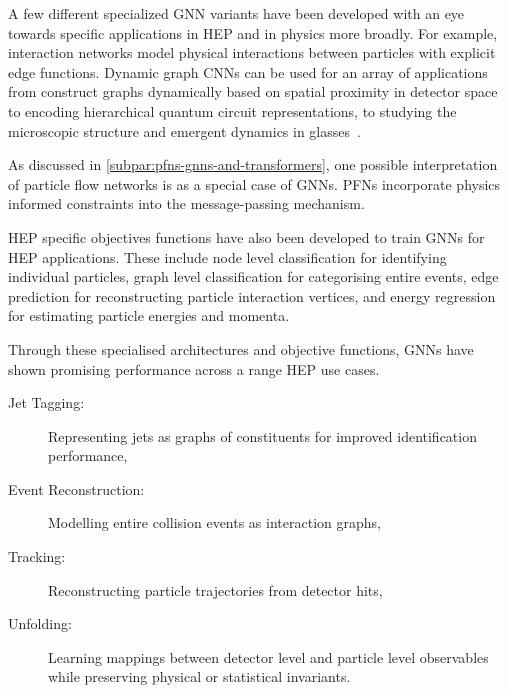                 A few different specialized GNN variants have been developed with an eye towards specific applications in HEP and in physics more broadly.
                For example,
                interaction networks model physical interactions between particles with explicit edge functions.
                Dynamic graph CNNs can be used for an array of applications from construct graphs dynamically based on spatial proximity in detector space to encoding hierarchical quantum circuit representations, to studying the microscopic structure and emergent dynamics in glasses~\cite{Wang:2018nkf, Ting:2025iom, Jung:2023wef, Lourens:2022vpu}.
                
                As discussed in \cref{subpar:pfns-gnns-and-transformers}, one possible interpretation of particle flow networks is as a special case of GNNs.
                PFNs incorporate physics informed constraints into the message-passing mechanism.
                
                HEP specific objectives functions have also been developed to train GNNs for HEP applications. 
                These include node level classification for identifying individual particles,
                graph level classification for categorising entire events,
                edge prediction for reconstructing particle interaction vertices,
                and energy regression for estimating particle energies and momenta.
        
                Through these specialised architectures and objective functions, GNNs have shown promising performance across a range HEP use cases.
                \begin{description}
                    \item [Jet Tagging:] Representing jets as graphs of constituents for improved identification performance,
                    \item [Event Reconstruction:] Modelling entire collision events as interaction graphs,
                    \item [Tracking:] Reconstructing particle trajectories from detector hits,
                    \item [Unfolding:] Learning mappings between detector level and particle level observables while preserving physical or statistical invariants.
                \end{description}
                
